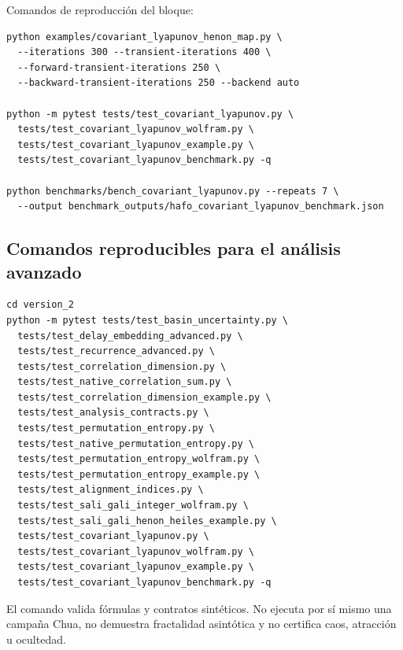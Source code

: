 Comandos de reproducción del bloque:
\begin{verbatim}
python examples/covariant_lyapunov_henon_map.py \
  --iterations 300 --transient-iterations 400 \
  --forward-transient-iterations 250 \
  --backward-transient-iterations 250 --backend auto

python -m pytest tests/test_covariant_lyapunov.py \
  tests/test_covariant_lyapunov_wolfram.py \
  tests/test_covariant_lyapunov_example.py \
  tests/test_covariant_lyapunov_benchmark.py -q

python benchmarks/bench_covariant_lyapunov.py --repeats 7 \
  --output benchmark_outputs/hafo_covariant_lyapunov_benchmark.json
\end{verbatim}

\subsection{Comandos reproducibles para el análisis avanzado}

\mbox{}\par
\begin{verbatim}
cd version_2
python -m pytest tests/test_basin_uncertainty.py \
  tests/test_delay_embedding_advanced.py \
  tests/test_recurrence_advanced.py \
  tests/test_correlation_dimension.py \
  tests/test_native_correlation_sum.py \
  tests/test_correlation_dimension_example.py \
  tests/test_analysis_contracts.py \
  tests/test_permutation_entropy.py \
  tests/test_native_permutation_entropy.py \
  tests/test_permutation_entropy_wolfram.py \
  tests/test_permutation_entropy_example.py \
  tests/test_alignment_indices.py \
  tests/test_sali_gali_integer_wolfram.py \
  tests/test_sali_gali_henon_heiles_example.py \
  tests/test_covariant_lyapunov.py \
  tests/test_covariant_lyapunov_wolfram.py \
  tests/test_covariant_lyapunov_example.py \
  tests/test_covariant_lyapunov_benchmark.py -q
\end{verbatim}
El comando valida fórmulas y contratos sintéticos. No ejecuta por sí mismo una
campaña Chua, no demuestra fractalidad asintótica y no certifica caos,
atracción u ocultedad.
